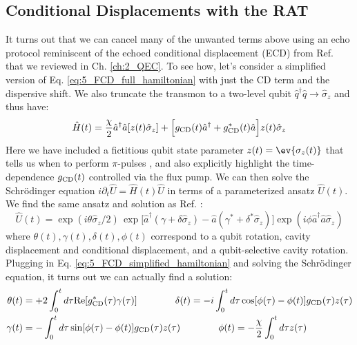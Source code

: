 \subsection{Conditional Displacements with the RAT}

It turns out that we can cancel many of the unwanted terms above using an echo protocol reminiscent of the echoed conditional displacement (ECD) from Ref. \cite{eickbusch2022fast} that we reviewed in Ch. \ref{ch:2_QEC}. To see how, let's consider a simplified version of Eq. \eqref{eq:5_FCD_full_hamiltonian} with just the CD term and the dispersive shift. We also truncate the transmon to a two-level qubit $\hat{q}^\dagger\hat{q} \to \hat{\sigma}_z$ and thus have:
\begin{equation}
\hat{H}(t) = \frac{\chi}{2}\hat{a}^\dagger\hat{a}[z(t)\hat{\sigma}_z]   + \Big[g_{\rm CD}(t)\hat{a}^\dagger + g_{\rm CD}^\ast(t)\hat{a}\Big]z(t)\hat{\sigma}_z
\label{eq:5_FCD_simplified_hamiltonian}
\end{equation}
Here we have included a fictitious qubit state parameter $z(t) = \ev{\sigma_z(t)}$ that tells us when to perform $\pi$-pulses \cite{eickbusch2022fast}, and also explicitly highlight the time-dependence $g_{\rm CD}(t)$ controlled via the flux pump. We can then solve the Schr\"odinger equation $i\partial_t\hat{U} = \hat{H}(t)\hat{U}$ in terms of a parameterized ansatz $\hat{U}(t)$. We find the same ansatz and solution as Ref. \cite{eickbusch2022fast}: 
\begin{equation}
    \hat{U}(t) = \exp(i\theta \hat{\sigma}_z / 2)\,\exp\!\Big[\hat{a}^\dagger(\gamma + \delta \hat{\sigma}_z) - \hat{a}(\gamma^\ast + \delta^\ast \hat{\sigma}_z)\Big]\exp(i\phi\hat{a}^\dagger\hat{a}\hat{\sigma}_z)
\end{equation}
where $\theta(t), \gamma(t), \delta(t), \phi(t)$ correspond to a qubit rotation, cavity displacement and conditional displacement, and a qubit-selective cavity rotation. Plugging in Eq. \eqref{eq:5_FCD_simplified_hamiltonian} and solving the Schr\"odinger equation, it turns out we can actually find a solution:
\begin{align}
    \begin{split}
        \theta(t) & = +2 \int_0^t d\tau \mathrm{Re}[g_{\rm CD}^*(\tau)\gamma(\tau)] \qquad \qquad\delta(t) = -i \int_0^t d\tau \cos[\phi(\tau)-\phi(t)] g_{\rm CD}(\tau)z(\tau) \\\gamma(t) & = - \int_0^t d\tau \sin[\phi(\tau)-\phi(t)] g_{\rm CD}(\tau)z(\tau) \qquad \qquad\phi(t) = -\frac{\chi}{2} \int_0^t d\tau z(\tau)
    \end{split}
\end{align}
